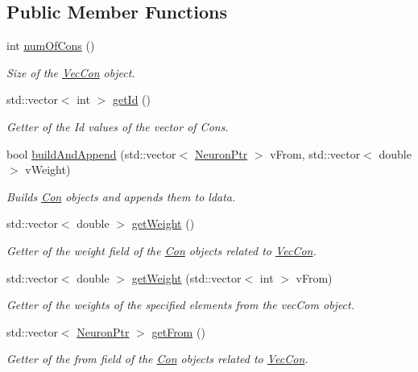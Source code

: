 \subsection*{Public Member Functions}
\begin{DoxyCompactItemize}
\item 
int \hyperlink{class_vec_con_aa9a397520b07fbeead0b6d252c1ea882}{numOfCons} ()
\begin{DoxyCompactList}\small\item\em Size of the \hyperlink{class_vec_con}{VecCon} object. \end{DoxyCompactList}\item 
std::vector$<$ int $>$ \hyperlink{class_vec_con_a03d5dde143e166e68b01c9596573eb5f}{getId} ()
\begin{DoxyCompactList}\small\item\em Getter of the Id values of the vector of Cons. \end{DoxyCompactList}\item 
bool \hyperlink{class_vec_con_a2ab58248509550b1c99435a90ece59f1}{buildAndAppend} (std::vector$<$ \hyperlink{_a_m_o_r_e_8h_ac1ea936c2c7728eb382278131652fef4}{NeuronPtr} $>$ vFrom, std::vector$<$ double $>$ vWeight)
\begin{DoxyCompactList}\small\item\em Builds \hyperlink{class_con}{Con} objects and appends them to ldata. \end{DoxyCompactList}\item 
std::vector$<$ double $>$ \hyperlink{class_vec_con_aafa37c30d566b8784ac84d23a14b5638}{getWeight} ()
\begin{DoxyCompactList}\small\item\em Getter of the weight field of the \hyperlink{class_con}{Con} objects related to \hyperlink{class_vec_con}{VecCon}. \end{DoxyCompactList}\item 
std::vector$<$ double $>$ \hyperlink{class_vec_con_a0de571e8fde8e354887e0b43b8d00772}{getWeight} (std::vector$<$ int $>$ vFrom)
\begin{DoxyCompactList}\small\item\em Getter of the weights of the specified elements from the vecCom object. \end{DoxyCompactList}\item 
std::vector$<$ \hyperlink{_a_m_o_r_e_8h_ac1ea936c2c7728eb382278131652fef4}{NeuronPtr} $>$ \hyperlink{class_vec_con_aee24ad1e9f3a8af771bef14cac0bf71d}{getFrom} ()
\begin{DoxyCompactList}\small\item\em Getter of the from field of the \hyperlink{class_con}{Con} objects related to \hyperlink{class_vec_con}{VecCon}. \end{DoxyCompactList}\item 

\end{DoxyCompactItemize}
